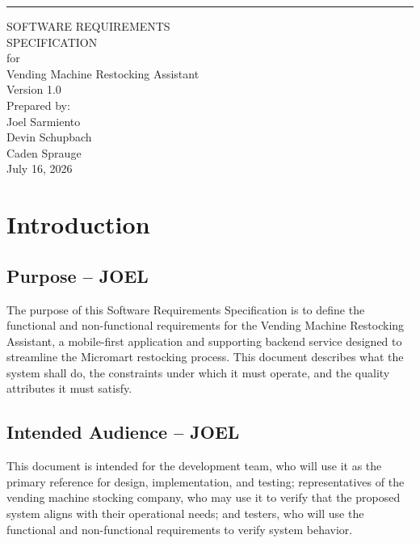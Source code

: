 \documentclass{scrreprt}
\date{}
\def\myversion{1.0 }
\begin{document}
\begin{flushright}
    \rule{16cm}{5pt}\vskip1cm
    \begin{bfseries}
        \Huge{SOFTWARE REQUIREMENTS\\ SPECIFICATION}\\
        \vspace{1.5cm}
        for\\
        \vspace{1.5cm}
        Vending Machine Restocking Assistant\\
        \vspace{1.5cm}
        \LARGE{Version \myversion}\\
        \vspace{1.5cm}
        Prepared by:\\
        Joel Sarmiento\\
        Devin Schupbach\\
        Caden Sprauge\\
        \vspace{1.5cm}
        July 16, 2026\\
    \end{bfseries}
\end{flushright}

\tableofcontents

\chapter{Introduction}

\section{Purpose -- JOEL}
The purpose of this Software Requirements Specification is to define the functional and non-functional requirements for the Vending Machine Restocking Assistant, a mobile-first application and supporting backend service designed to streamline the Micromart restocking process. This document describes what the system shall do, the constraints under which it must operate, and the quality attributes it must satisfy.

\section{Intended Audience -- JOEL}
This document is intended for the development team, who will use it as the primary reference for design, implementation, and testing; representatives of the vending machine stocking company, who may use it to verify that the proposed system aligns with their operational needs; and testers, who will use the functional and non-functional requirements to verify system behavior.
\end{document}
